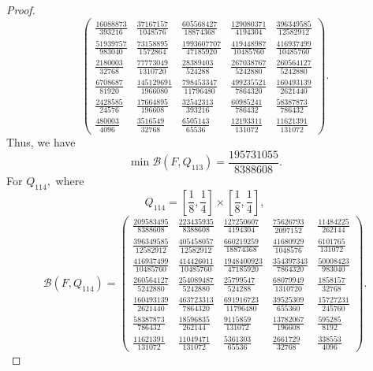 \documentclass[a4paper,12pt,reqno]{amsart} %
\numberwithin{equation}{section}
\theoremstyle{definition}
\begin{document}
\begin{proof}
\[\begin{pmatrix}
	\frac{16088873}{393216} & \frac{37167157}{1048576} & \frac{605568427}{18874368} & \frac{129080371}{4194304} & \frac{396349585}{12582912}\\[5mm]
	\frac{51939757}{983040} & \frac{73158895}{1572864} & \frac{1993607707}{47185920} & \frac{419448987}{10485760} & \frac{416937499}{10485760}\\[5mm]
	\frac{2180003}{32768} & \frac{77773049}{1310720} & \frac{28389403}{524288} & \frac{267038767}{5242880} & \frac{260564127}{5242880}\\[5mm]
	\frac{6708687}{81920} & \frac{145129691}{1966080} & \frac{798453347}{11796480} & \frac{499235521}{7864320} & \frac{160493139}{2621440}\\[5mm]
	\frac{2428585}{24576} & \frac{17664895}{196608} & \frac{32542313}{393216} & \frac{60985241}{786432} & \frac{58387873}{786432}\\[5mm]
	\frac{480003}{4096} & \frac{3516549}{32768} & \frac{6505143}{65536} & \frac{12193311}{131072} & \frac{11621391}{131072}
\end{pmatrix}.
\]
Thus, we have
\[
\min \mathcal B(F,Q_{113})=\frac{195731055}{8388608}.
\]
For $Q_{114},$ where
\[
Q_{114}=\left[\frac18,\frac14\right]\times\left[\frac18,\frac14\right],
\]
\[
\mathcal B(F,Q_{114})=
\begin{pmatrix}
	\frac{209583495}{8388608} & \frac{223435935}{8388608} & \frac{127250607}{4194304} & \frac{75626793}{2097152} & \frac{11484225}{262144}\\[5mm]
	\frac{396349585}{12582912} & \frac{405458057}{12582912} & \frac{660219259}{18874368} & \frac{41680929}{1048576} & \frac{6101765}{131072}\\[5mm]
	\frac{416937499}{10485760} & \frac{414426011}{10485760} & \frac{1948400923}{47185920} & \frac{354397343}{7864320} & \frac{50008423}{983040}\\[5mm]
	\frac{260564127}{5242880} & \frac{254089487}{5242880} & \frac{25799547}{524288} & \frac{68079949}{1310720} & \frac{1858157}{32768}\\[5mm]
	\frac{160493139}{2621440} & \frac{463723313}{7864320} & \frac{691916723}{11796480} & \frac{39525309}{655360} & \frac{15727231}{245760}\\[5mm]
	\frac{58387873}{786432} & \frac{18596835}{262144} & \frac{9115859}{131072} & \frac{13782067}{196608} & \frac{595285}{8192}\\[5mm]
	\frac{11621391}{131072} & \frac{11049471}{131072} & \frac{5361303}{65536} & \frac{2661729}{32768} & \frac{338553}{4096}
\end{pmatrix}.
\]
\end{proof}
\end{document}
